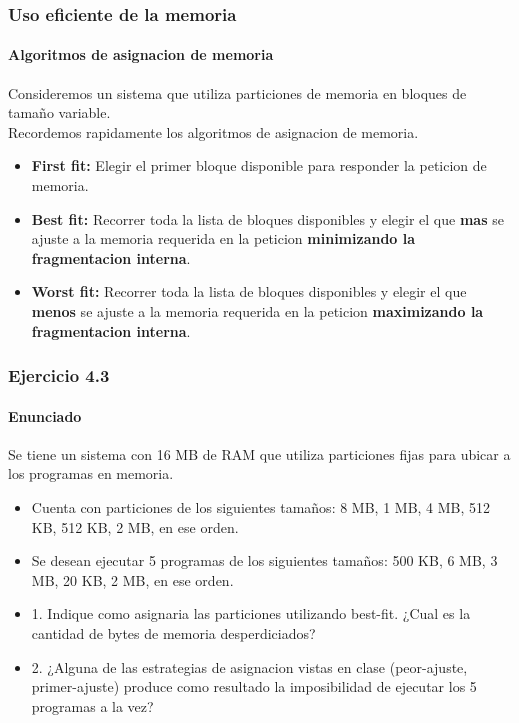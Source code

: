 \documentclass{beamer}
\begin{document}
\begin{frame}
  \frametitle{Uso eficiente de la memoria}    
  \framesubtitle{Algoritmos de asignacion de memoria}
  Consideremos un sistema que utiliza particiones de memoria en bloques de tamaño variable.\\  
  Recordemos rapidamente los algoritmos de asignacion de memoria.
  \begin{itemize}
    \setlength{\itemsep}{7pt}
    \pause
    \item \textbf{First fit:} Elegir el primer bloque disponible para responder la peticion de memoria.
    \pause
    \item \textbf{Best fit:} Recorrer toda la lista de bloques disponibles y elegir el que \textbf{mas} se ajuste a la memoria requerida en la peticion \textbf{minimizando la fragmentacion interna}.
    \pause
    \item \textbf{Worst fit:} Recorrer toda la lista de bloques disponibles y elegir el que \textbf{menos} se ajuste a la memoria requerida en la peticion \textbf{maximizando la fragmentacion interna}.
  \end{itemize}
\end{frame}

\begin{frame}
  \frametitle{Ejercicio 4.3}
  \framesubtitle{Enunciado}
      Se tiene un sistema con 16 MB de RAM que utiliza particiones fijas para ubicar a los programas
      en memoria. 
      \begin{itemize}
          \setlength{\itemsep}{8pt}
          \item Cuenta con particiones de los siguientes tamaños:
          8 MB, 1 MB, 4 MB, 512 KB, 512 KB, 2 MB, en ese orden.
          \item Se desean ejecutar 5 programas de los siguientes tamaños:
          500 KB, 6 MB, 3 MB, 20 KB, 2 MB, en ese orden.
          \item 1. Indique como asignaria las particiones utilizando best-fit. ¿Cual es la cantidad de bytes de memoria desperdiciados?
          \item 2. ¿Alguna de las estrategias de asignacion vistas en clase (peor-ajuste, primer-ajuste) produce como resultado la imposibilidad de ejecutar los 5 programas a la vez?
      \end{itemize}
\end{frame}
\end{document}
